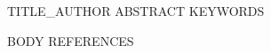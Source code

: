 \documentclass[preprint,12pt]{elsarticle}
\begin{document}
\begin{frontmatter}
{{TITLE_AUTHOR}}
{{ABSTRACT}}
{{KEYWORDS}}
\end{frontmatter}
{{BODY}}
{{REFERENCES}}
\end{document}
